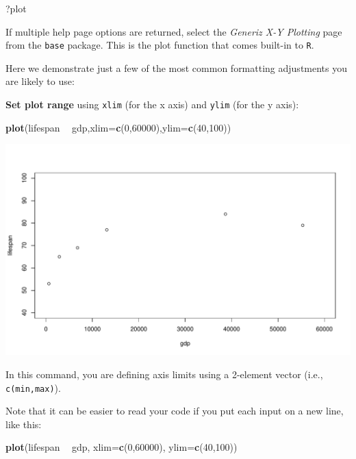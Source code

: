 \documentclass[
]{book}
\newenvironment{Shaded}{\begin{snugshade}}{\end{snugshade}}
\newcommand{\DataTypeTok}[1]{\textcolor[rgb]{0.13,0.29,0.53}{#1}}
\newcommand{\DecValTok}[1]{\textcolor[rgb]{0.00,0.00,0.81}{#1}}
\newcommand{\KeywordTok}[1]{\textcolor[rgb]{0.13,0.29,0.53}{\textbf{#1}}}
\newcommand{\NormalTok}[1]{#1}
\newcommand{\OperatorTok}[1]{\textcolor[rgb]{0.81,0.36,0.00}{\textbf{#1}}}
\newcommand{\StringTok}[1]{\textcolor[rgb]{0.31,0.60,0.02}{#1}}
\begin{document}
\begin{Shaded}
\begin{Highlighting}[]
\NormalTok{?plot}
\end{Highlighting}
\end{Shaded}

If multiple help page options are returned, select the \emph{Generiz X-Y Plotting} page from the \texttt{base} package. This is the plot function that comes built-in to \texttt{R}.

Here we demonstrate just a few of the most common formatting adjustments you are likely to use:

\textbf{Set plot range} using \texttt{xlim} (for the x axis) and \texttt{ylim} (for the y axis):

\begin{Shaded}
\begin{Highlighting}[]
\KeywordTok{plot}\NormalTok{(lifespan }\OperatorTok{~}\StringTok{ }\NormalTok{gdp,}\DataTypeTok{xlim=}\KeywordTok{c}\NormalTok{(}\DecValTok{0}\NormalTok{,}\DecValTok{60000}\NormalTok{),}\DataTypeTok{ylim=}\KeywordTok{c}\NormalTok{(}\DecValTok{40}\NormalTok{,}\DecValTok{100}\NormalTok{))}
\end{Highlighting}
\end{Shaded}

\includegraphics{figures/unnamed-chunk-104-1.pdf}

In this command, you are defining axis limits using a 2-element vector (i.e., \texttt{c(min,max)}).

Note that it can be easier to read your code if you put each input on a new line, like this:

\begin{Shaded}
\begin{Highlighting}[]
\KeywordTok{plot}\NormalTok{(lifespan }\OperatorTok{~}\StringTok{ }\NormalTok{gdp,}
     \DataTypeTok{xlim=}\KeywordTok{c}\NormalTok{(}\DecValTok{0}\NormalTok{,}\DecValTok{60000}\NormalTok{),}
     \DataTypeTok{ylim=}\KeywordTok{c}\NormalTok{(}\DecValTok{40}\NormalTok{,}\DecValTok{100}\NormalTok{))}
\end{Highlighting}
\end{Shaded}
\end{document}
